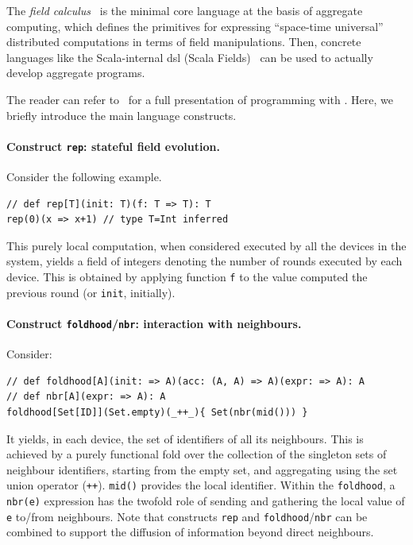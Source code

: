 The \emph{field calculus}~\cite{AVDPB-TOCL2019} 
 is the minimal core language 
 at the basis of aggregate computing,
 which defines the primitives for 
 expressing ``space-time universal''~\cite{DBLP:conf/coordination/AudritoBDV18} distributed computations in terms of field manipulations.
%
Then, concrete languages like the Scala-internal \ac{dsl} \scafi{} ({\sc{}Sca}la {\sc{}Fi}elds)~\cite{DBLP:journals/softx/CasadeiVAP22,ACDV-LMCS2023} 
 can be used to actually develop aggregate programs.
%

The reader can refer to~\cite{ACDV-LMCS2023}
 for a full presentation of programming with \scafi{}.
%
%
%
Here, we briefly introduce the main language constructs.

\paragraph*{Construct \lstinline|rep|: stateful field evolution.} Consider the following example.
\begin{lstlisting}
// def rep[T](init: T)(f: T => T): T
rep(0)(x => x+1) // type T=Int inferred
\end{lstlisting}
This purely local computation, when considered executed by all the devices in the system, yields a field of integers denoting 
 the number of rounds executed by each device.
%
This is obtained by applying function \lstinline|f| to the value computed the previous round (or \lstinline|init|, initially).

\paragraph*{Construct \lstinline|foldhood|/\lstinline|nbr|: interaction with neighbours.} Consider: 
\begin{lstlisting}
// def foldhood[A](init: => A)(acc: (A, A) => A)(expr: => A): A
// def nbr[A](expr: => A): A
foldhood[Set[ID]](Set.empty)(_++_){ Set(nbr(mid())) }
\end{lstlisting}
%
It yields, in each device, the set of identifiers of all its neighbours.
%
This is achieved by a purely functional fold over the collection of the singleton sets of neighbour identifiers, starting from the empty set, and aggregating using the set union operator (\lstinline|++|).
%
\lstinline|mid()| provides the local identifier. 
 Within the \lstinline|foldhood|, a \lstinline|nbr(e)| expression has the twofold role of sending and gathering the local value of \lstinline|e| to/from neighbours.
%
Note that constructs \lstinline|rep| and \lstinline|foldhood|/\lstinline|nbr| can be combined to support the diffusion of information beyond direct neighbours.


